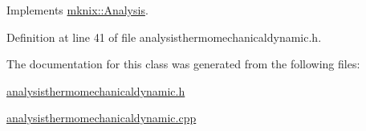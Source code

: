 Implements \hyperlink{classmknix_1_1_analysis_a6dd7026a22ae11f3eef3dad3be370e70}{mknix\+::\+Analysis}.



Definition at line 41 of file analysisthermomechanicaldynamic.\+h.



The documentation for this class was generated from the following files\+:\begin{DoxyCompactItemize}
\item 
\hyperlink{analysisthermomechanicaldynamic_8h}{analysisthermomechanicaldynamic.\+h}\item 
\hyperlink{analysisthermomechanicaldynamic_8cpp}{analysisthermomechanicaldynamic.\+cpp}\end{DoxyCompactItemize}
